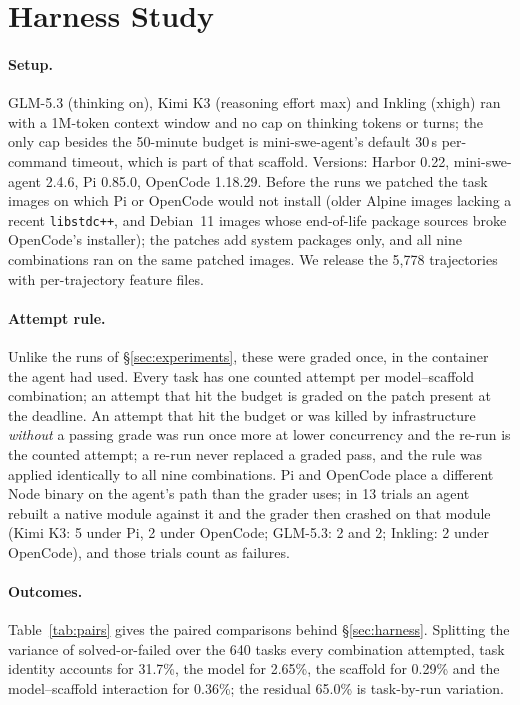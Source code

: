 \section{Harness Study}
\label{app:harness}

\paragraph{Setup.} GLM-5.3 (thinking on), Kimi K3 (reasoning effort max) and Inkling (xhigh) ran with a 1M-token context window and no cap on thinking tokens or turns; the only cap besides the 50-minute budget is mini-swe-agent's default 30\,s per-command timeout, which is part of that scaffold. Versions: Harbor 0.22, mini-swe-agent 2.4.6, Pi 0.85.0, OpenCode 1.18.29. Before the runs we patched the task images on which Pi or OpenCode would not install (older Alpine images lacking a recent \texttt{libstdc++}, and Debian~11 images whose end-of-life package sources broke OpenCode's installer); the patches add system packages only, and all nine combinations ran on the same patched images. We release the 5{,}778 trajectories with per-trajectory feature files.

\paragraph{Attempt rule.} Unlike the runs of \S\ref{sec:experiments}, these were graded once, in the container the agent had used. Every task has one counted attempt per model--scaffold combination; an attempt that hit the budget is graded on the patch present at the deadline. An attempt that hit the budget or was killed by infrastructure \emph{without} a passing grade was run once more at lower concurrency and the re-run is the counted attempt; a re-run never replaced a graded pass, and the rule was applied identically to all nine combinations. Pi and OpenCode place a different Node binary on the agent's path than the grader uses; in 13 trials an agent rebuilt a native module against it and the grader then crashed on that module (Kimi K3: 5 under Pi, 2 under OpenCode; GLM-5.3: 2 and 2; Inkling: 2 under OpenCode), and those trials count as failures.

\paragraph{Outcomes.} Table~\ref{tab:pairs} gives the paired comparisons behind \S\ref{sec:harness}. Splitting the variance of solved-or-failed over the 640 tasks every combination attempted, task identity accounts for 31.7\%, the model for 2.65\%, the scaffold for 0.29\% and the model--scaffold interaction for 0.36\%; the residual 65.0\% is task-by-run variation.


